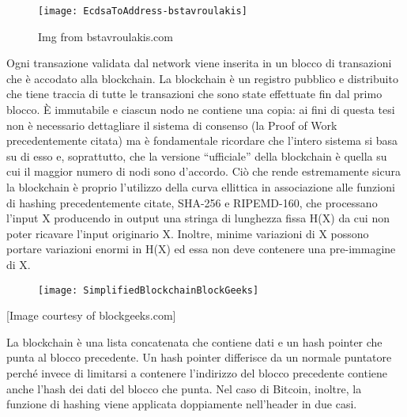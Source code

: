 \begin{figure}[h!]
\centering
\texttt{[image: EcdsaToAddress-bstavroulakis]}
\caption{Img from bstavroulakis.com}
\label{fig:ecdsatoaddress-bstavroulakis}
\end{figure}


Ogni transazione validata dal network viene inserita in un blocco di transazioni che è accodato alla blockchain.
La blockchain è un registro pubblico e distribuito che tiene traccia di tutte le transazioni che sono state effettuate fin dal primo blocco. È immutabile e ciascun nodo ne contiene una copia: ai fini di questa tesi non è necessario dettagliare il sistema di consenso (la Proof of Work precedentemente citata) ma è fondamentale ricordare che l’intero sistema si basa su di esso e, soprattutto, che la versione “ufficiale” della blockchain è quella su cui il maggior numero di nodi sono d’accordo. Ciò che rende estremamente sicura la blockchain è proprio l’utilizzo della curva ellittica in associazione alle funzioni di hashing precedentemente citate, SHA-256 e RIPEMD-160, che processano l’input X producendo in output una stringa di lunghezza fissa H(X) da cui non poter ricavare l’input originario X. Inoltre, minime variazioni di X possono portare variazioni enormi in H(X) ed essa non deve contenere una pre-immagine di X.

\begin{figure}[h!]
\centering
\texttt{[image: SimplifiedBlockchainBlockGeeks]}
\caption{}
\label{fig:simplifiedblockchainblockgeeks}
\end{figure}

[Image courtesy of blockgeeks.com]

La blockchain è una lista concatenata che contiene dati e un hash pointer che punta al blocco precedente. Un hash pointer differisce da un normale puntatore perché invece di limitarsi a contenere l’indirizzo del blocco precedente contiene anche l’hash dei dati del blocco che punta. Nel caso di Bitcoin, inoltre, la funzione di hashing viene applicata doppiamente nell’header in due casi.\\

